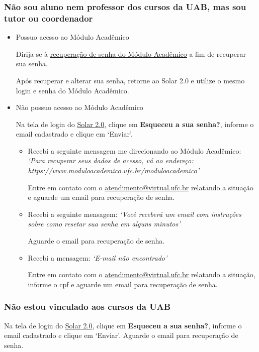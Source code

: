 \documentclass[letterpaper,10pt,english]{sphinxmanual}
\begin{document}
\subsubsection{Não sou aluno nem professor dos cursos da UAB, mas sou tutor ou coordenador}
\label{faq:nao-sou-aluno-nem-professor-dos-cursos-da-uab-mas-sou-tutor-ou-coordenador}\begin{itemize}
\item {} 
Possuo acesso ao Módulo Acadêmico

Dirija-se à \href{https://www.moduloacademico.ufc.br/moduloacademico/guest/recuperarSenhaForm.do}{recuperação de senha do Módulo Acadêmico} a fim de recuperar sua senha.

Após recuperar e alterar sua senha, retorne ao Solar 2.0 e utilize o mesmo login e senha do Módulo Acadêmico.

\item {} 
Não possuo acesso ao Módulo Acadêmico

Na tela de login do \href{http://www.solar.virtual.ufc.br}{Solar 2.0}, clique em \textbf{Esqueceu a sua senha?}, informe o email cadastrado e clique em `Enviar'.
\begin{itemize}
\item {} 
Recebi a seguinte mensagem me direcionando ao Módulo Acadêmico: \emph{`Para recuperar seus dados de acesso, vá ao endereço: https://www.moduloacademico.ufc.br/moduloacademico'}

Entre em contato com o \href{mailto:atendimento@virtual.ufc.br}{atendimento@virtual.ufc.br} relatando a situação e aguarde um email para recuperação de senha.

\item {} 
Recebi a seguinte mensagem: \emph{`Você receberá um email com instruções sobre como resetar sua senha em alguns minutos'}

Aguarde o email para recuperação de senha.

\item {} 
Recebi a mensagem: \emph{`E-mail não encontrado'}

Entre em contato com o \href{mailto:atendimento@virtual.ufc.br}{atendimento@virtual.ufc.br} relatando a situação, informe o cpf e aguarde um email para recuperação de senha.

\end{itemize}

\end{itemize}


\subsubsection{Não estou vinculado aos cursos da UAB}
\label{faq:nao-estou-vinculado-aos-cursos-da-uab}
Na tela de login do \href{http://www.solar.virtual.ufc.br}{Solar 2.0}, clique em \textbf{Esqueceu a sua senha?}, informe o email cadastrado e clique em `Enviar'. Aguarde o email para recuperação de senha.
\end{document}
